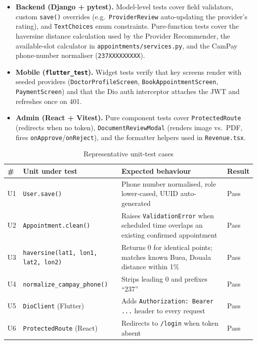 \begin{itemize}
  \item \textbf{Backend (Django + pytest).} Model-level tests cover field validators, custom \texttt{save()} overrides (e.g.\ \texttt{ProviderReview} auto-updating the provider's rating), and \texttt{TextChoices} enum constraints. Pure-function tests cover the haversine distance calculation used by the Provider Recommender, the available-slot calculator in \texttt{appointments/services.py}, and the CamPay phone-number normaliser (\texttt{237XXXXXXXXX}).
  \item \textbf{Mobile (\texttt{flutter\_test}).} Widget tests verify that key screens render with seeded providers (\texttt{DoctorProfileScreen}, \texttt{BookAppointmentScreen}, \texttt{PaymentScreen}) and that the Dio auth interceptor attaches the JWT and refreshes once on 401.
  \item \textbf{Admin (React + Vitest).} Pure component tests cover \texttt{ProtectedRoute} (redirects when no token), \texttt{DocumentReviewModal} (renders image vs.\ PDF, fires \texttt{onApprove}/\texttt{onReject}), and the formatter helpers used in \texttt{Revenue.tsx}.
\end{itemize}

\begin{table}[H]
\centering
\caption{Representative unit-test cases}
\label{tab:unit-tests}
\small
\begin{tabularx}{\textwidth}{|p{0.6cm}|p{4.8cm}|X|p{1.4cm}|}
\hline
\textbf{\#} & \textbf{Unit under test} & \textbf{Expected behaviour} & \textbf{Result} \\ \hline

U1 & \texttt{User.save()} & Phone number normalised, role lower-cased, UUID auto-generated & Pass \\ \hline
U2 & \texttt{Appointment.clean()} & Raises \texttt{ValidationError} when scheduled time overlaps an existing confirmed appointment & Pass \\ \hline
U3 & \texttt{haversine(lat1, lon1, lat2, lon2)} & Returns 0 for identical points; matches known Buea, Douala distance within 1\% & Pass \\ \hline
U4 & \texttt{normalize\_campay\_phone()} & Strips leading 0 and prefixes ``237'' & Pass \\ \hline
U5 & \texttt{DioClient} (Flutter) & Adds \texttt{Authorization: Bearer ...} header to every request & Pass \\ \hline
U6 & \texttt{ProtectedRoute} (React) & Redirects to \texttt{/login} when token absent & Pass \\ \hline

\end{tabularx}
\end{table}

